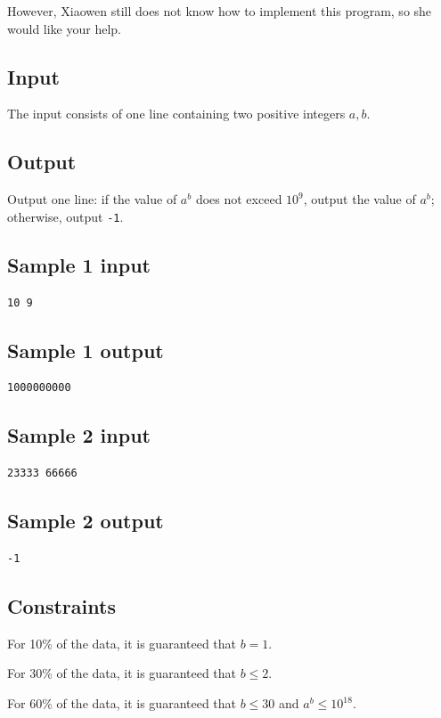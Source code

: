 \documentclass[11pt]{article}
\begin{document}
However, Xiaowen still does not know how to implement this program,
so she would like your help.

\subsection*{Input}
The input consists of one line containing two positive integers
$a,b$.

\subsection*{Output}
Output one line: if the value of
$a^b$ does not exceed
$10^9$, output the value of
$a^b$; otherwise, output \texttt{-1}.

\subsection*{Sample 1 input}
\begin{verbatim}
10 9
\end{verbatim}

\subsection*{Sample 1 output}
\begin{verbatim}
1000000000
\end{verbatim}

\subsection*{Sample 2 input}
\begin{verbatim}
23333 66666
\end{verbatim}

\subsection*{Sample 2 output}
\begin{verbatim}
-1
\end{verbatim}

\subsection*{Constraints}
For 10\% of the data, it is guaranteed that $b=1$.

For 30\% of the data, it is guaranteed that $b\leq 2$.

For 60\% of the data, it is guaranteed that $b\leq 30$ and
$a^b\leq 10^{18}$.
\end{document}
